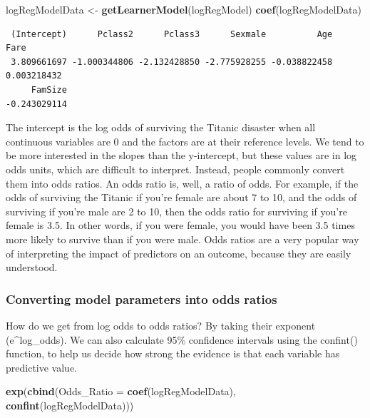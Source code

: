 \documentclass[
]{article}
\newenvironment{Shaded}{\begin{snugshade}}{\end{snugshade}}
\newcommand{\AttributeTok}[1]{\textcolor[rgb]{0.13,0.29,0.53}{#1}}
\newcommand{\FunctionTok}[1]{\textcolor[rgb]{0.13,0.29,0.53}{\textbf{#1}}}
\newcommand{\NormalTok}[1]{#1}
\newcommand{\OtherTok}[1]{\textcolor[rgb]{0.56,0.35,0.01}{#1}}
\begin{document}
\begin{Shaded}
\begin{Highlighting}[]
\NormalTok{logRegModelData }\OtherTok{\textless{}{-}} \FunctionTok{getLearnerModel}\NormalTok{(logRegModel)}
\FunctionTok{coef}\NormalTok{(logRegModelData)}
\end{Highlighting}
\end{Shaded}

\begin{verbatim}
 (Intercept)      Pclass2      Pclass3      Sexmale          Age         Fare 
 3.809661697 -1.000344806 -2.132428850 -2.775928255 -0.038822458  0.003218432 
     FamSize 
-0.243029114 
\end{verbatim}

The intercept is the log odds of surviving the Titanic disaster when all
continuous variables are 0 and the factors are at their reference
levels. We tend to be more interested in the slopes than the
y-intercept, but these values are in log odds units, which are difficult
to interpret. Instead, people commonly convert them into odds ratios. An
odds ratio is, well, a ratio of odds. For example, if the odds of
surviving the Titanic if you're female are about 7 to 10, and the odds
of surviving if you're male are 2 to 10, then the odds ratio for
surviving if you're female is 3.5. In other words, if you were female,
you would have been 3.5 times more likely to survive than if you were
male. Odds ratios are a very popular way of interpreting the impact of
predictors on an outcome, because they are easily understood.

\subsubsection{Converting model parameters into odds
ratios}\label{converting-model-parameters-into-odds-ratios}

How do we get from log odds to odds ratios? By taking their exponent
(e\^{}log\_odds). We can also calculate 95\% confidence intervals using
the confint() function, to help us decide how strong the evidence is
that each variable has predictive value.

\begin{Shaded}
\begin{Highlighting}[]
\FunctionTok{exp}\NormalTok{(}\FunctionTok{cbind}\NormalTok{(}\AttributeTok{Odds\_Ratio =} \FunctionTok{coef}\NormalTok{(logRegModelData), }\FunctionTok{confint}\NormalTok{(logRegModelData)))}
\end{Highlighting}
\end{Shaded}
\end{document}
